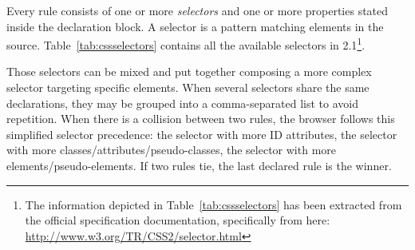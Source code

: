 Every rule consists of one or more \emph{selectors} and one or more properties stated inside the declaration block.
A selector is a pattern matching elements in the  source.
Table~\vref{tab:cssselectors} contains all the available selectors in  2.1\footnote{The information depicted in Table~\vref{tab:cssselectors} has been extracted from the official specification documentation, specifically from here: \url{http://www.w3.org/TR/CSS2/selector.html}}.

Those selectors can be mixed and put together composing a more complex selector targeting specific elements.
When several selectors share the same declarations, they may be grouped into a comma-separated list to avoid repetition.
When there is a collision between two rules, the browser follows this simplified selector precedence: the selector with more ID attributes, the selector with more classes/attributes/pseudo-classes, the selector with more elements/pseudo-elements.
If two rules tie, the last declared rule is the winner.

